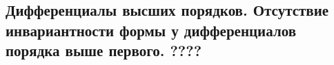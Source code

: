 {
\subsection{Дифференциалы высших порядков. Отсутствие инвариантности формы у дифференциалов порядка выше первого. ????}
}